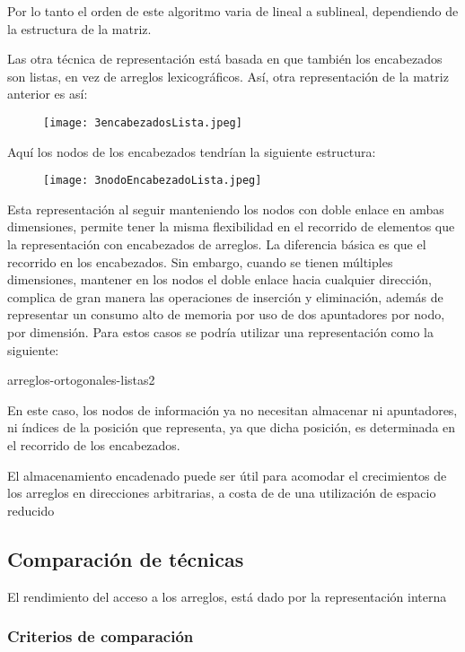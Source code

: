 Por lo tanto el orden de este algoritmo varia de lineal a sublineal,
dependiendo de la estructura de la matriz.

Las otra técnica de representación está basada en que también los
encabezados son listas, en vez de arreglos lexicográficos.  Así, otra
representación de la matriz anterior es así:
\begin{figure}[H]
  \centering
  \texttt{[image: 3encabezadosLista.jpeg]}
\end{figure}

Aquí los nodos de los encabezados tendrían la siguiente estructura:
\begin{figure}[H]
  \centering
  \texttt{[image: 3nodoEncabezadoLista.jpeg]}
\end{figure}

Esta representación al seguir manteniendo los nodos con doble enlace
en ambas dimensiones, permite tener la misma flexibilidad en el
recorrido de elementos que la representación con encabezados de
arreglos.  La diferencia básica es que el recorrido en los
encabezados.  Sin embargo, cuando se tienen múltiples dimensiones,
mantener en los nodos el doble enlace hacia cualquier dirección,
complica de gran manera las operaciones de inserción y eliminación,
además de representar un consumo alto de memoria por uso de dos
apuntadores por nodo, por dimensión.  Para estos casos se podría
utilizar una representación como la siguiente:

\begin{center}
  arreglos-ortogonales-listas2
\end{center}

En este caso, los nodos de información ya no necesitan almacenar ni
apuntadores, ni índices de la posición que representa, ya que dicha
posición, es determinada en el recorrido de los encabezados.

El almacenamiento encadenado puede ser útil para acomodar el
crecimientos de los arreglos en direcciones arbitrarias, a costa de de
una utilización de espacio reducido

\subsection{Comparación de técnicas}
\label{sec:comp-de-tecn}

El rendimiento del acceso a los arreglos, está dado por la
representación interna

\subsubsection{Criterios de comparación}
\label{sec:crit-de-comp}

